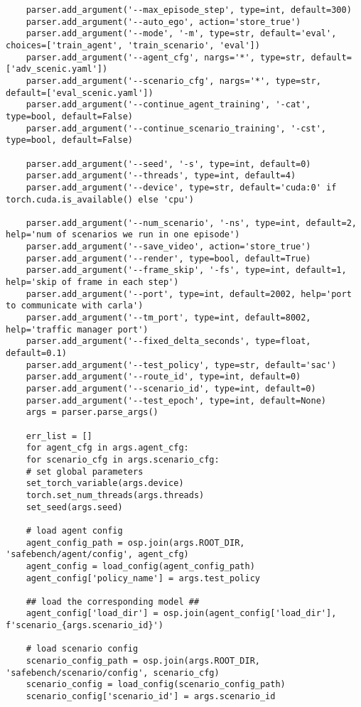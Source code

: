 \begin{enumerate}
\begin{verbatim}
	parser.add_argument('--max_episode_step', type=int, default=300)
	parser.add_argument('--auto_ego', action='store_true')
	parser.add_argument('--mode', '-m', type=str, default='eval', choices=['train_agent', 'train_scenario', 'eval'])
	parser.add_argument('--agent_cfg', nargs='*', type=str, default=['adv_scenic.yaml'])
	parser.add_argument('--scenario_cfg', nargs='*', type=str, default=['eval_scenic.yaml'])
	parser.add_argument('--continue_agent_training', '-cat', type=bool, default=False)
	parser.add_argument('--continue_scenario_training', '-cst', type=bool, default=False)
	
	parser.add_argument('--seed', '-s', type=int, default=0)
	parser.add_argument('--threads', type=int, default=4)
	parser.add_argument('--device', type=str, default='cuda:0' if torch.cuda.is_available() else 'cpu')   
	
	parser.add_argument('--num_scenario', '-ns', type=int, default=2, help='num of scenarios we run in one episode')
	parser.add_argument('--save_video', action='store_true')
	parser.add_argument('--render', type=bool, default=True)
	parser.add_argument('--frame_skip', '-fs', type=int, default=1, help='skip of frame in each step')
	parser.add_argument('--port', type=int, default=2002, help='port to communicate with carla')
	parser.add_argument('--tm_port', type=int, default=8002, help='traffic manager port')
	parser.add_argument('--fixed_delta_seconds', type=float, default=0.1)
	parser.add_argument('--test_policy', type=str, default='sac')
	parser.add_argument('--route_id', type=int, default=0)
	parser.add_argument('--scenario_id', type=int, default=0)
	parser.add_argument('--test_epoch', type=int, default=None)
	args = parser.parse_args()
	
	err_list = []
	for agent_cfg in args.agent_cfg:
	for scenario_cfg in args.scenario_cfg:
	# set global parameters
	set_torch_variable(args.device)
	torch.set_num_threads(args.threads)
	set_seed(args.seed)
	
	# load agent config
	agent_config_path = osp.join(args.ROOT_DIR, 'safebench/agent/config', agent_cfg)
	agent_config = load_config(agent_config_path)
	agent_config['policy_name'] = args.test_policy
	
	## load the corresponding model ##
	agent_config['load_dir'] = osp.join(agent_config['load_dir'], f'scenario_{args.scenario_id}')
	
	# load scenario config
	scenario_config_path = osp.join(args.ROOT_DIR, 'safebench/scenario/config', scenario_cfg)
	scenario_config = load_config(scenario_config_path)
	scenario_config['scenario_id'] = args.scenario_id
	

\end{verbatim}
\end{enumerate}
